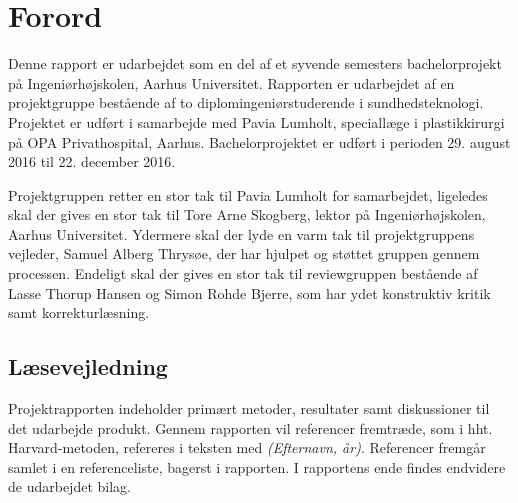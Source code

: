 \chapter*{Forord}

Denne rapport er udarbejdet som en del af et syvende semesters bachelorprojekt på Ingeniørhøjskolen, Aarhus Universitet. Rapporten er udarbejdet af en projektgruppe bestående af to diplomingeniørstuderende i sundhedsteknologi. Projektet er udført i samarbejde med Pavia Lumholt, speciallæge i plastikkirurgi på OPA Privathospital, Aarhus. 
Bachelorprojektet er udført i perioden 29. august 2016 til 22. december 2016. 

Projektgruppen retter en stor tak til Pavia Lumholt for samarbejdet, ligeledes skal der gives en stor tak til Tore Arne Skogberg, lektor på Ingeniørhøjskolen, Aarhus Universitet. Ydermere skal der lyde en varm tak til projektgruppens vejleder, Samuel Alberg Thrysøe, der har hjulpet og støttet gruppen gennem processen. Endeligt skal der gives en stor tak til reviewgruppen bestående af Lasse Thorup Hansen og Simon Rohde Bjerre, som har ydet konstruktiv kritik samt korrekturlæsning. 

\vspace{2cm}


\begin{centering}
\begin{multicols}{2}

\columnbreak
{}

\end{multicols}
\end{centering}

\vspace{1cm}

\section*{Læsevejledning}
Projektrapporten indeholder primært metoder, resultater samt diskussioner til det udarbejde produkt. 
Gennem rapporten vil referencer fremtræde, som i hht. Harvard-metoden, refereres i teksten med \textit{(Efternavn, år)}. Referencer fremgår samlet i en referenceliste, bagerst i rapporten. I rapportens ende findes endvidere de udarbejdet bilag. 


 
